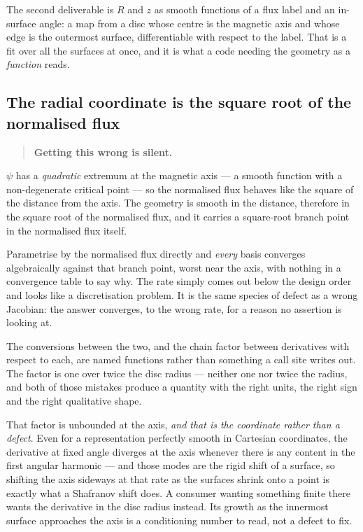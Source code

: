 The second deliverable is $R$ and $z$ as smooth functions of a flux label and an
in-surface angle: a map from a disc whose centre is the magnetic axis and whose
edge is the outermost surface, differentiable with respect to the label. That is
a fit over all the surfaces at once, and it is what a code needing the geometry as
a \emph{function} reads.

\subsection{The radial coordinate is the square root of the normalised flux}

\begin{quote}
	\textbf{Getting this wrong is silent.}
\end{quote}

$\psi$ has a \emph{quadratic} extremum at the magnetic axis --- a smooth function
with a non-degenerate critical point --- so the normalised flux behaves like the
square of the distance from the axis. The geometry is smooth in the distance,
therefore in the square root of the normalised flux, and it carries a square-root
branch point in the normalised flux itself.

Parametrise by the normalised flux directly and \emph{every} basis converges
algebraically against that branch point, worst near the axis, with nothing in a
convergence table to say why. The rate simply comes out below the design order
and looks like a discretisation problem. It is the same species of defect as a
wrong Jacobian: the answer converges, to the wrong rate, for a reason no
assertion is looking at.

The conversions between the two, and the chain factor between derivatives with
respect to each, are named functions rather than something a call site writes
out. The factor is one over twice the disc radius --- neither one nor twice the
radius, and both of those mistakes produce a quantity with the right units, the
right sign and the right qualitative shape.

That factor is unbounded at the axis, \emph{and that is the coordinate rather
than a defect}. Even for a representation perfectly smooth in Cartesian
coordinates, the derivative at fixed angle diverges at the axis whenever there is
any content in the first angular harmonic --- and those modes are the rigid shift
of a surface, so shifting the axis sideways at that rate as the surfaces shrink
onto a point is exactly what a Shafranov shift does. A consumer wanting something
finite there wants the derivative in the disc radius instead. Its growth as the
innermost surface approaches the axis is a conditioning number to read, not a
defect to fix.

